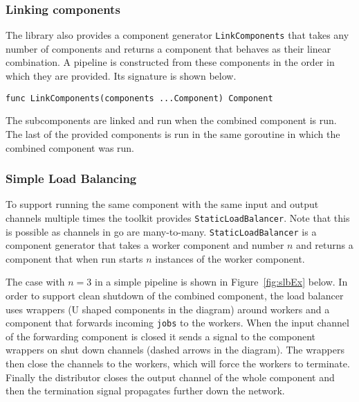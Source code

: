 \subsubsection{Linking components}
The library also provides a component generator \texttt{LinkComponents} that takes 
any number of components and returns a component that behaves as their 
linear combination. A pipeline is constructed from these components 
in the order in which they are provided. Its signature is shown below.
\begin{lstlisting}
func LinkComponents(components ...Component) Component
\end{lstlisting}
The subcomponents are linked and run when the combined component is run. 
The last of the provided components is run in the same goroutine in which
the combined component was run.

\subsubsection{Simple Load Balancing}
To support running the same component with the same input and output 
channels multiple times the toolkit provides \texttt{StaticLoadBalancer}.
Note that this is possible as channels in go are many-to-many.
\texttt{StaticLoadBalancer} is a component generator that takes a worker 
component and number $n$ and returns a component that when run starts 
$n$ instances of the worker component. 

The case with $n=3$ in a simple pipeline is shown in Figure~\ref{fig:slbEx} below. 
In order to support clean shutdown of the combined component, the load balancer uses 
wrappers (U shaped components in the diagram) around workers and a component that 
forwards incoming \texttt{jobs} to the workers. When the input channel of the 
forwarding
component is closed it sends a signal to the component wrappers on shut 
down channels (dashed arrows in the diagram). The wrappers then close
the channels to the workers, which will force the workers to terminate.
Finally the distributor closes the output channel of the whole component
and then the termination signal propagates further down the network.

